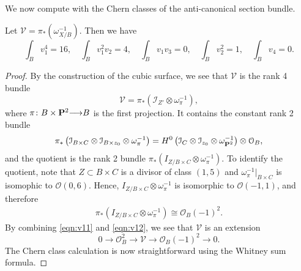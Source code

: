 \documentclass[12pt,reqno]{amsart}
\renewcommand{\to}{{\longrightarrow}}
\numberwithin{equation}{section}
\renewcommand{\O}{\mathcal O}
\begin{document}
We now compute with the Chern classes of the anti-canonical section bundle.
\begin{proposition}\label{lem:v1}
  Let $\mathcal V = \pi_* \left( \omega_{X/B}^{-1} \right)$.
  Then we have
  \[
    \int_{B}v_{1}^{4} = 16, \quad \int_{B}v_{1}^{2}v_{2} = 4,\quad \int_{B}v_{1}v_{3} =0,\quad \int_{B}v_2^{2} = 1,\quad \int_{B}v_{4} = 0.\]
\end{proposition}
\begin{proof}
By the construction of the cubic surface, we see that $\mathcal V$ is the rank 4 bundle
\[ \mathcal V = \pi_* (\mathcal I_{Z'} \otimes \omega_{\pi}^{-1}),\]
where $\pi \colon B \times \P^2 \to B$ is the first projection.
It contains the constant rank 2 bundle
\begin{equation}\label{eqn:v11}
  \pi_*\left( \mathcal I_{B \times C} \otimes \mathcal I_{B \times z_0} \otimes \omega_\pi^{-1} \right) = H^0\left(\mathcal I_{C} \otimes \mathcal I_{z_0} \otimes \omega_{\P^2}^{-1}\right) \otimes \O_{B},
\end{equation}
and the quotient is the rank 2 bundle $\pi_*\left( I_{Z/B \times C} \otimes \omega_\pi^{-1} \right)$.
To identify the quotient, note that $Z \subset B \times C$ is a divisor of class $(1,5)$ and $\omega^{-1}_{\pi}|_{B\times C}$ is isomophic to $\O(0,6)$.
Hence, $I_{Z/B \times C} \otimes \omega_\pi^{-1}$ is isomorphic to $\O(-1,1)$, and therefore
\begin{equation}\label{eqn:v12}
  \begin{split}
    \pi_*\left( I_{Z/B \times C} \otimes \omega_\pi^{-1} \right) \cong \O_{B}(-1)^{2}.
  \end{split}
\end{equation}
By combining \eqref{eqn:v11} and \eqref{eqn:v12}, we see that $\mathcal V$ is an extension
\begin{equation}\label{eqn:V1}
  0 \to \O_{B}^2 \to \mathcal V \to \O_{B}(-1)^2 \to 0.
\end{equation}
The Chern class calculation is now straightforward using the Whitney sum formula.
\end{proof}
\end{document}
